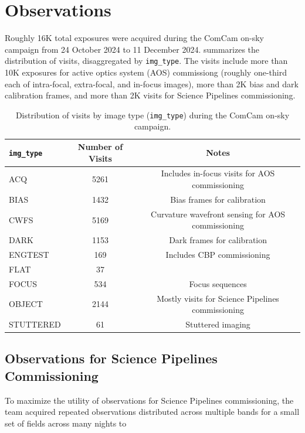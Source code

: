 \section{Observations}
\label{sec:observations}

Roughly 16K total exposures were acquired during the ComCam on-sky campaign from 24 October 2024 to 11 December 2024.
 summarizes the distribution of visits, disaggregated by \texttt{img\_type}.
The visits include more than 10K exposures for active optics system (AOS) commissiong (roughly one-third each of intra-focal, extra-focal, and in-focus images), more than 2K bias and dark calibration frames, and more than 2K visits for Science Pipelines commissioning.

\begin{table}
    \centering
    \begin{tabular}{@{}lcc@{}}
    \textbf{\texttt{img\_type}} & \textbf{Number of Visits} & \textbf{Notes} \\
    \hline
    ACQ & 5261 & Includes in-focus visits for AOS commissioning \\
    BIAS & 1432 & Bias frames for calibration \\
    CWFS & 5169 & Curvature wavefront sensing for AOS commissioning \\
    DARK & 1153 & Dark frames for calibration \\
    ENGTEST & 169 & Includes CBP commissioning \\
    FLAT & 37 & \\
    FOCUS & 534 & Focus sequences \\
    OBJECT & 2144 & Mostly visits for Science Pipelines commissioning \\
    STUTTERED & 61 & Stuttered imaging \\
    \end{tabular}
    \caption{Distribution of visits by image type (\texttt{img\_type}) during the ComCam on-sky campaign.}
    \label{tab:img_type}
\end{table}

\subsection{Observations for Science Pipelines Commissioning}

To maximize the utility of observations for Science Pipelines commissioning, the team acquired repeated observations distributed across multiple bands for a small set of fields across many nights to

